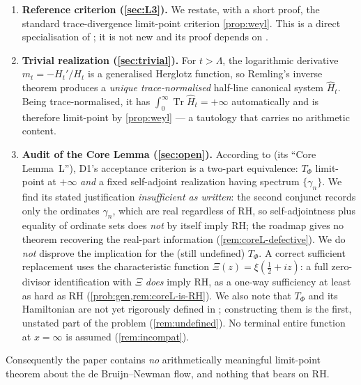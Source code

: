 \documentclass[12pt,a4paper]{amsart}
\theoremstyle{plain}
\theoremstyle{definition}
\newcommand{\Tr}{\operatorname{Tr}}
\newcommand{\Ham}{H}
\begin{document}
\begin{enumerate}[label=(\arabic*)]
  \item \textbf{Reference criterion (\cref{sec:L3}).}  We restate, with a
        short proof, the standard trace-divergence limit-point criterion
        \cref{prop:weyl}.  This is a direct specialisation of
        \cite[Theorem~3.5]{Remling2018}; it is not new and its proof
        depends on \cite{Remling2018}.
  \item \textbf{Trivial realization (\cref{sec:trivial}).}  For
        $t>\Lambda$, the logarithmic derivative $m_t=-H_t'/H_t$ is a
        generalised Herglotz function, so Remling's inverse theorem
        \cite[Theorem~5.1]{Remling2018} produces a \emph{unique
        trace-normalised} half-line canonical system $\widehat\Ham_t$.
        Being trace-normalised, it has
        $\int_0^\infty \Tr\widehat\Ham_t = +\infty$ automatically and is
        therefore limit-point by \cref{prop:weyl} --- a tautology that
        carries no arithmetic content.
  \item \textbf{Audit of the Core Lemma (\cref{sec:open}).}  According to
        \cite{SpecRoadmap} (its ``Core Lemma~L''), D1's acceptance
        criterion is a two-part equivalence: $T_\Phi$ limit-point at
        $+\infty$ \emph{and} a fixed self-adjoint realization having
        spectrum $\{\gamma_n\}$.  We find its stated justification
        \emph{insufficient as written}: the second conjunct records only
        the ordinates $\gamma_n$, which are real regardless of RH, so
        self-adjointness plus equality of ordinate sets does \emph{not} by
        itself imply RH; the roadmap gives no theorem recovering the
        real-part information (\cref{rem:coreL-defective}).  We do
        \emph{not} disprove the implication for the (still undefined)
        $T_\Phi$.  A correct sufficient replacement uses the
        characteristic function $\Xi(z)=\xi(\tfrac12+iz)$: a full
        zero-divisor identification with $\Xi$ \emph{does} imply RH, as a
        one-way sufficiency at least as hard as RH
        (\cref{prob:gen,rem:coreL-is-RH}).  We also note that $T_\Phi$ and
        its Hamiltonian are not yet rigorously defined in
        \cite{SpecRoadmap}; constructing them is the first, unstated part
        of the problem (\cref{rem:undefined}).  No terminal entire
        function at $x=\infty$ is assumed (\cref{rem:incompat}).
\end{enumerate}

Consequently the paper contains \emph{no} arithmetically meaningful
limit-point theorem about the de Bruijn--Newman flow, and nothing that
bears on RH.
\end{document}
